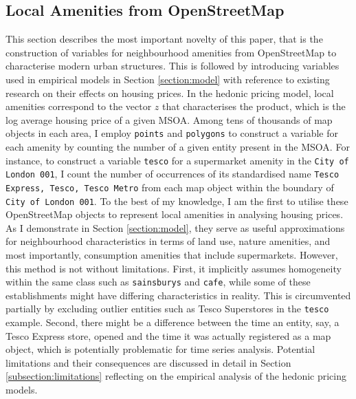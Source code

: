 \documentclass{article}
\begin{document}
\subsection{Local Amenities from OpenStreetMap} \label{subsection:variable}
This section describes the most important novelty of this paper, that is the construction of variables for neighbourhood amenities from OpenStreetMap to characterise modern urban structures. This is followed by introducing variables used in empirical models in Section \ref{section:model} with reference to existing research on their effects on housing prices. In the hedonic pricing model, local amenities correspond to the vector $z$ that characterises the product, which is the log average housing price of a given MSOA. Among tens of thousands of map objects in each area, I employ \texttt{points} and \texttt{polygons} to construct a variable for each amenity by counting the number of a given entity present in the MSOA. For instance, to construct a variable \texttt{tesco} for a supermarket amenity in the \texttt{City of London 001}, I count the number of occurrences of its standardised name \texttt{Tesco Express, Tesco, Tesco Metro} from each map object within the boundary of \texttt{City of London 001}. To the best of my knowledge, I am the first to utilise these OpenStreetMap objects to represent local amenities in analysing housing prices. As I demonstrate in Section \ref{section:model}, they serve as useful approximations for neighbourhood characteristics in terms of land use, nature amenities, and most importantly, consumption amenities that include supermarkets. However, this method is not without limitations. First, it implicitly assumes homogeneity within the same class such as \texttt{sainsburys} and \texttt{cafe}, while some of these establishments might have differing characteristics in reality. This is circumvented partially by excluding outlier entities such as Tesco Superstores in the \texttt{tesco} example. Second, there might be a difference between the time an entity, say, a Tesco Express store, opened and the time it was actually registered as a map object, which is potentially problematic for time series analysis. Potential limitations and their consequences are discussed in detail in Section \ref{subsection:limitations} reflecting on the empirical analysis of the hedonic pricing models. \\\\
\end{document}
